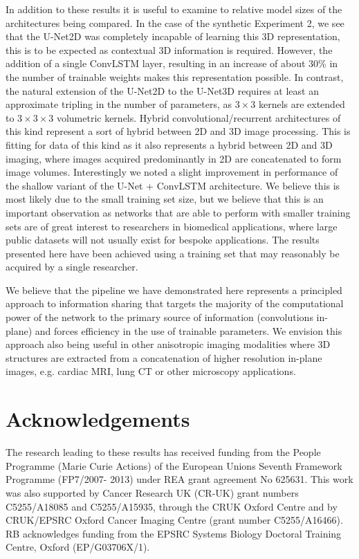 \documentclass[journal,transmag]{IEEEtran}
\begin{document}
In addition to these results it is useful to examine to relative model sizes of the architectures being compared. In the case of the synthetic Experiment 2, we see that the U-Net2D was completely incapable of learning this 3D representation, this is to be expected as contextual 3D information is required. However, the addition of a single ConvLSTM layer, resulting in an increase of about 30\% in the number of trainable weights makes this representation possible. In contrast, the natural extension of the U-Net2D to the U-Net3D requires at least an approximate tripling in the number of parameters, as $3\times3$ kernels are extended to $3\times3\times3$ volumetric kernels. Hybrid convolutional/recurrent architectures of this kind represent a sort of hybrid between 2D and 3D image processing. This is fitting for data of this kind as it also represents a hybrid between 2D and 3D imaging, where images acquired predominantly in 2D are concatenated to form image volumes. Interestingly we noted a slight improvement in performance of the shallow variant of the U-Net + ConvLSTM architecture. We believe this is most likely due to the small training set size, but we believe that this is an important observation as networks that are able to perform with smaller training sets are of great interest to researchers in biomedical applications, where large public datasets will not usually exist for bespoke applications. The results presented here have been achieved using a training set that may reasonably be acquired by a single researcher.

We believe that the pipeline we have demonstrated here represents a principled approach to information sharing that targets the majority of the computational power of the network to the primary source of information (convolutions in-plane) and forces efficiency in the use of trainable parameters. We envision this approach also being useful in other anisotropic imaging modalities where 3D structures are extracted from a concatenation of higher resolution in-plane images, e.g. cardiac MRI, lung CT or other microscopy applications.

\section{Acknowledgements}

The research leading to these results has received funding
from the People Programme (Marie Curie Actions) of the
European Unions Seventh Framework Programme (FP7/2007-
2013) under REA grant agreement No 625631. This work
was also supported by Cancer Research UK (CR-UK) grant
numbers C5255/A18085 and C5255/A15935, through the
CRUK Oxford Centre and by CRUK/EPSRC Oxford Cancer Imaging Centre (grant number C5255/A16466). RB acknowledges funding from the
EPSRC Systems Biology Doctoral Training Centre, Oxford
(EP/G03706X/1).



\end{document}
